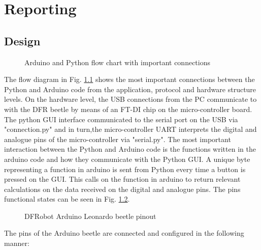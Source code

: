 \chapter{Reporting} \label{ch:reporting}


\vspace{-1cm}
\section{Design} \label{sec:rep_design}



\begin{figure}[H]
    \centering
    \caption{Arduino and Python flow chart with important connections}
    \label{fig:APcodeflow}
\end{figure}

The flow diagram in Fig. \ref{fig:APcodeflow} shows the most important connections between the Python and Arduino code from the application, protocol and hardware structure levels. 
On the hardware level, the USB connections from the PC communicate to with the DFR beetle by means of an FT-DI chip on the micro-controller board. The python GUI interface communicated to the serial port on the USB via "connection.py" and in turn,the micro-controller UART interprets the digital and analogue pins of the micro-controller via "serial.py". The most important interaction between the Python and Arduino code is the functions written in the arduino code and how they communicate with the Python GUI.
A unique byte representing a function in arduino is sent from Python every time a button is pressed on the GUI. This calls on the function in arduino to return relevant calculations on the data received on the digital and analogue pins. The pins functional states can be seen in Fig. \ref{fig:microC}.

\begin{figure}[H]
    \centering
    \caption{DFRobot Arduino Leonardo beetle pinout}
    \label{fig:microC}
\end{figure}

The pins of the Arduino beetle are connected and configured in the following manner:

